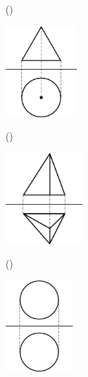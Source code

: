 \documentclass[
  12pt,a4paper,lualatex,ja=standard]{bxjsarticle}
\begin{document}
\begin{flushleft}
\begin{multicols}{2}
\begin{center}
\end{center}

\columnbreak

()\hspace{2.5pt}

\begin{center}
\def\@captype{figure}
\includegraphics[height=35mm]{img/img4.jpg}

\end{center}

\end{multicols}

\vfill

\begin{multicols}{2}
()\hspace{2.5pt}

\begin{center}
\def\@captype{figure}
\includegraphics[height=35mm]{img/img5.jpg}

\end{center}

\columnbreak

()\hspace{2.5pt}

\begin{center}
\def\@captype{figure}
\includegraphics[height=35mm]{img/img6.jpg}


\end{center}
\end{multicols}
\end{flushleft}
\end{document}
